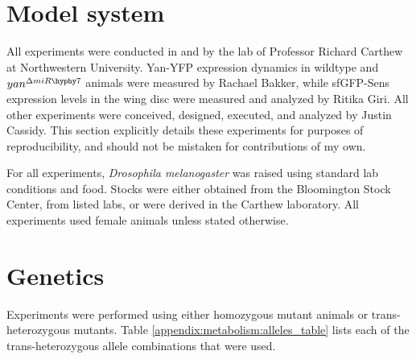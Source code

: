 \graphicspath{ {./figures/metabolism/} }


\section{Model system}

All experiments were conducted in and by the lab of Professor Richard Carthew at Northwestern University. Yan-YFP expression dynamics in wildtype and $yan^{\Delta miR\hyphy 7}$ animals were measured by Rachael Bakker, while sfGFP-Sens expression levels in the wing disc were measured and analyzed by Ritika Giri. All other experiments were conceived, designed, executed, and analyzed by Justin Cassidy. This section explicitly details these experiments for purposes of reproducibility, and should not be mistaken for contributions of my own.

For all experiments, \textit{Drosophila melanogaster} was raised using standard lab conditions and food. Stocks were either obtained from the Bloomington Stock Center, from listed labs, or were derived in the Carthew laboratory. All experiments used female animals unless stated otherwise. 

\section{Genetics}
\label{appendix:metabolism:genetics}

Experiments were performed using either homozygous mutant animals or trans-heterozygous mutants. Table \ref{appendix:metabolism:alleles_table} lists each of the trans-heterozygous allele combinations that were used.

